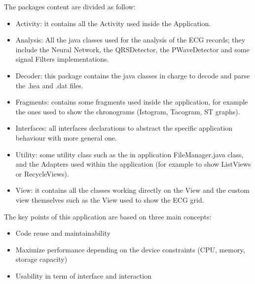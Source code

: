 The packages content are divided as follow:
\begin{itemize}
	\item Activity: it contains all the Activity used inside the Application.
    \item Analysis: All the java classes used for the analysis of the ECG records; they include the Neural Network, the QRSDetector, the PWaveDetector and some signal Filters implementations.
	\item Decoder:  this package contains the java classes in charge to decode and parse the .hea and .dat files.
	\item Fragments: contains some fragments used inside the application, for example  the ones used to show the chronograms (Istogram, Tacogram, ST graphs).
	\item Interfaces: all interfaces declarations to abstract the specific application behaviour with more general one.
	\item Utility: some utility class such as the in application FileManager.java class, and the Adapters used within the application (for example to show ListViews or RecycleViews).
	\item View: it contains all the classes working directly on the View and the custom view themselves such as the View used to show the ECG grid.
\end{itemize}
The key points of this application are based on three main concepts:
\begin{itemize}
	\item Code reuse and maintainability
	\item Maximize performance depending on the device constraints (CPU, memory, storage capacity)
	\item Usability in term of interface and interaction
\end{itemize}
